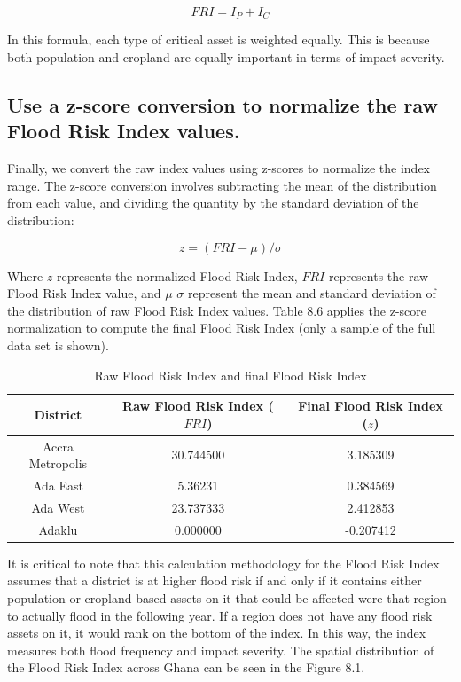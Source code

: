 \[ FRI = I_P + I_C \]

In this formula, each type of critical asset is weighted equally. This is because both population and cropland are equally important in terms of impact severity.

\subsection{Use a z-score conversion to normalize the raw Flood Risk Index values.}

Finally, we convert the raw index values using z-scores to normalize the index range. The z-score conversion involves subtracting the mean of the distribution from each value, and dividing the quantity by the standard deviation of the distribution:

\[ z = ({FRI-\mu})/{\sigma} \]

Where \({z}\) represents the normalized Flood Risk Index, \({FRI}\) represents the raw Flood Risk Index value, and \({\mu}\) \({\sigma}\) represent the mean and standard deviation of the distribution of raw Flood Risk Index values. Table 8.6 applies the z-score normalization to compute the final Flood Risk Index (only a sample of the full data set is shown). \\

\begin{table}
\centering
\begin{tabular}{|c|c|c|}
\hline
\textbf{District} & \textbf{Raw Flood Risk Index (\({FRI}\))} & \textbf{Final Flood Risk Index (\({z}\))}\\
\hline
Accra Metropolis\rule{0pt}{4ex} & 30.744500 & 3.185309\\
Ada East\rule{0pt}{4ex} & 5.36231 & 0.384569\\
Ada West\rule{0pt}{4ex} & 23.737333 & 2.412853\\
Adaklu\rule{0pt}{4ex} & 0.000000 & -0.207412\\
\hline
\end{tabular}
\caption{Raw Flood Risk Index and final Flood Risk Index}
\end{table}

It is critical to note that this calculation methodology for the Flood Risk Index assumes that a district is at higher flood risk if and only if it contains either population or cropland-based assets on it that could be affected were that region to actually flood in the following year. If a region does not have any flood risk assets on it, it would rank on the bottom of the index. In this way, the index measures both flood frequency and impact severity. The spatial distribution of the Flood Risk Index across Ghana can be seen in the Figure 8.1.\\

